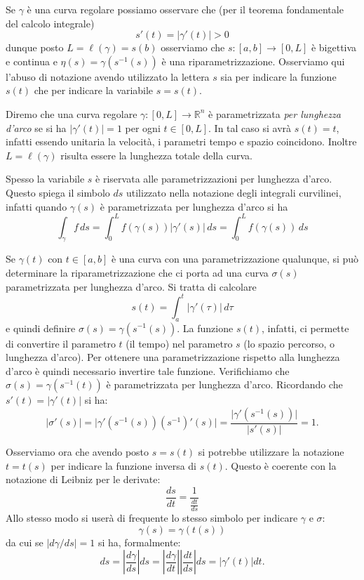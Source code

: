 \documentclass[italian,a4paper]{scrartcl}
\newcommand{\RR}{{\mathbb R}}
\newcommand{\defeq}{=}
\begin{document}
Se $\gamma$ è
una curva regolare possiamo osservare che (per il teorema fondamentale
del calcolo integrale)
\[
s'(t) = |\gamma'(t)| > 0
\]
dunque posto $L=\ell(\gamma)=s(b)$ osserviamo che
$s\colon[a,b]\to[0,L]$ è bigettiva e continua e $\eta(s) =
\gamma(s^{-1}(s))$ è una riparametrizzazione. Osserviamo qui l'abuso
di notazione avendo utilizzato la lettera $s$ sia per indicare la
funzione $s(t)$ che per indicare la variabile $s=s(t)$.

Diremo che una curva regolare $\gamma\colon [0,L]\to \RR^n$
è parametrizzata \emph{per lunghezza
  d'arco} se si ha $\lvert \gamma'(t)\rvert = 1$ per ogni
$t\in[0,L]$. 
In tal caso si avrà $s(t)=t$, infatti essendo unitaria la velocità, i
parametri tempo e spazio coincidono. Inoltre $L=\ell(\gamma)$ risulta
essere la lunghezza totale della curva.

Spesso la variabile $s$ è riservata alle parametrizzazioni per
lunghezza d'arco. Questo spiega
il simbolo $ds$ utilizzato nella notazione degli
integrali curvilinei, infatti
quando $\gamma(s)$ è parametrizzata per lunghezza d'arco
si ha
\[
  \int_\gamma f\, ds = \int_0^L f(\gamma(s))\lvert \gamma'(s)\rvert\,
  ds
 = \int_0^L f(\gamma(s))\, ds
\]

Se $\gamma(t)$ con $t\in[a,b]$ è una curva con una parametrizzazione qualunque, si può
determinare la riparametrizzazione che ci porta ad una curva
$\sigma(s)$ parametrizzata per lunghezza d'arco. Si tratta di
calcolare
\[
  s(t) = \int_a^t \lvert\gamma'(\tau)\rvert\, d\tau
\]
e quindi definire $\sigma(s) \defeq \gamma(s^{-1}(s))$. La funzione
$s(t)$, infatti, ci permette di convertire il parametro $t$ (il tempo)
nel parametro $s$ (lo spazio percorso, o lunghezza d'arco). Per ottenere una
parametrizzazione rispetto alla lunghezza d'arco è quindi necessario
invertire tale funzione. Verifichiamo che $\sigma(s)=\gamma(s^{-1}(t))$ è parametrizzata
per lunghezza d'arco. Ricordando che
$s'(t) = \lvert \gamma'(t)\rvert$ si ha:
\[
\lvert \sigma'(s) \rvert = \lvert \gamma'(s^{-1}(s))
(s^{-1})'(s)\rvert  = \frac{\lvert \gamma'(s^{-1}(s))\rvert}{\lvert
  s'(s)\rvert}
= 1.
\]

Osserviamo ora che avendo posto $s=s(t)$ si potrebbe utilizzare la
notazione $t=t(s)$ per indicare la funzione inversa di $s(t)$.
Questo è coerente con la
notazione di Leibniz per le derivate:
\[
  \frac{ds}{dt} = \frac{1}{\frac{dt}{ds}}
\]
Allo stesso modo si userà di frequente lo stesso simbolo per indicare
$\gamma$ e $\sigma$:
\[
  \gamma(s) \defeq \gamma(t(s))
\]
da cui se $\lvert d\gamma/ds \rvert = 1$ si ha, formalmente:
\[
  ds = \left| \frac{d\gamma}{ds}\right| ds =
  \left|\frac{d\gamma}{dt}\right| \left|\frac{dt}{ds}\right| ds =
  \lvert \gamma'(t)\rvert dt.
\]
\end{document}
